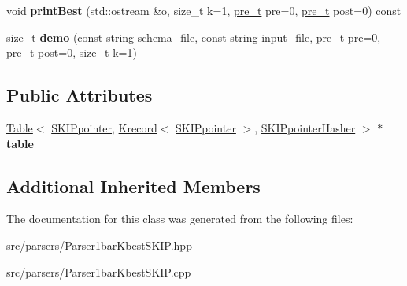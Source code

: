 \begin{DoxyCompactItemize}
\mbox{\label{classParser1barKbestSKIP_aac22b853439faa9ec80094eda5ef2a9a}} 
void {\bfseries print\+Best} (std\+::ostream \&o, size\+\_\+t k=1, \mbox{\hyperlink{group__general_ga092fe8b972dfa977c2a0886720a7731e}{pre\+\_\+t}} pre=0, \mbox{\hyperlink{group__general_ga092fe8b972dfa977c2a0886720a7731e}{pre\+\_\+t}} post=0) const
\item 
\mbox{\label{classParser1barKbestSKIP_a7adf9ec6b44a042d836bdeaaf05514c0}} 
size\+\_\+t {\bfseries demo} (const string schema\+\_\+file, const string input\+\_\+file, \mbox{\hyperlink{group__general_ga092fe8b972dfa977c2a0886720a7731e}{pre\+\_\+t}} pre=0, \mbox{\hyperlink{group__general_ga092fe8b972dfa977c2a0886720a7731e}{pre\+\_\+t}} post=0, size\+\_\+t k=1)
\end{DoxyCompactItemize}
\subsection*{Public Attributes}
\begin{DoxyCompactItemize}
\item 
\mbox{\label{classParser1barKbestSKIP_a9fba94719734e5717baa6c01a844cf07}} 
\mbox{\hyperlink{classTable}{Table}}$<$ \mbox{\hyperlink{classSKIPpointer}{S\+K\+I\+Ppointer}}, \mbox{\hyperlink{classKrecord}{Krecord}}$<$ \mbox{\hyperlink{classSKIPpointer}{S\+K\+I\+Ppointer}} $>$, \mbox{\hyperlink{structSKIPpointerHasher}{S\+K\+I\+Ppointer\+Hasher}} $>$ $\ast$ {\bfseries table}
\end{DoxyCompactItemize}
\subsection*{Additional Inherited Members}


The documentation for this class was generated from the following files\+:\begin{DoxyCompactItemize}
\item 
src/parsers/Parser1bar\+Kbest\+S\+K\+I\+P.\+hpp\item 
src/parsers/Parser1bar\+Kbest\+S\+K\+I\+P.\+cpp\end{DoxyCompactItemize}
